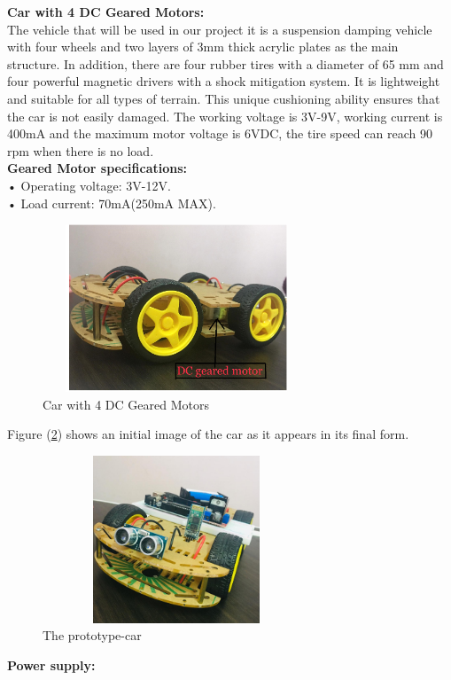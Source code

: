 \documentclass[12pt,a4paper]{report}
\begin{document}

\textbf{{ Car with 4 DC Geared Motors:}}\\

The vehicle that will be used in our project it is a suspension damping vehicle with four wheels and two layers of 3mm thick acrylic plates as the main structure. In addition, there are four rubber tires with a diameter of 65 mm and four powerful magnetic drivers with a shock mitigation system. It is lightweight and suitable for all types of terrain. This unique cushioning ability ensures that the car is not easily damaged. The working voltage is 3V-9V, working current is 400mA and the maximum motor voltage is 6VDC, the tire speed can reach 90 rpm when there is no load. \\

\textbf{{Geared Motor specifications:}}\\

•	Operating voltage: 3V-12V.\\
•	Load current: 70mA(250mA MAX).\\


\begin{figure}[H]
    \centering
    \graphicspath{ {./images/} }
    \includegraphics[width=8cm, height=5cm]{cardcmotor.PNG}
    \caption{ Car with 4 DC Geared Motors}
    \label{fig:mesh1}
\end{figure}

Figure (\ref{fig:car}) shows an initial image of the car as it appears in its final form.
\begin{figure}[H]
    \centering
    \graphicspath{ {./images/} }
    \includegraphics[width=8cm, height=5cm]{prototype.jpg}
    \caption{The prototype-car}
    \label{fig:car}
\end{figure}
\textbf{{Power supply:}}\\
\end{document}
